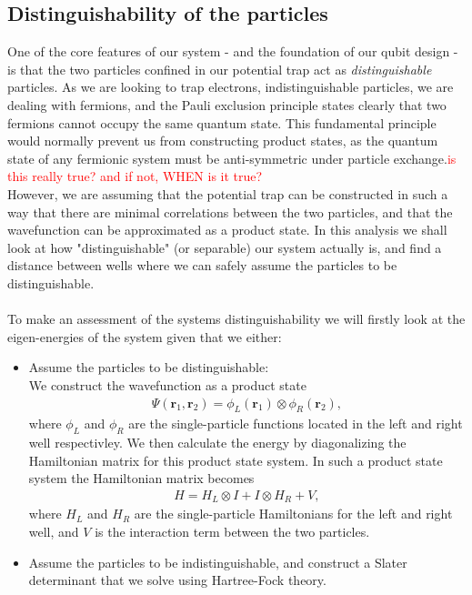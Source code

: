 \documentclass{subfiles}
\begin{document}
\subsection{Distinguishability of the particles}\label{sec:distinguishability}
One of the core features of our system - and the foundation of our qubit design - is that the two particles confined in our potential trap act as \emph{distinguishable} particles. As we are looking to trap electrons, indistinguishable particles, we are dealing with fermions, and the Pauli exclusion principle states clearly that two fermions cannot occupy the same quantum state. This fundamental principle would normally prevent us from constructing product states, as the quantum state of any fermionic system must be anti-symmetric under particle exchange.\textcolor{red}{is this really true? and if not, WHEN is it true?}
\\ However, we are assuming that the potential trap can be constructed in such a way that there are minimal correlations between the two particles, and that the wavefunction can be approximated as a product state. In this analysis we shall look at how "distinguishable" (or separable) our system actually is, and find a distance between wells where we can safely assume the particles to be distinguishable. \\ \\
To make an assessment of the systems distinguishability we will firstly look at the eigen-energies of the system given that we either:
\begin{itemize}
    \item Assume the particles to be distinguishable: \\ We construct the wavefunction as a product state
    \begin{align*}
        \Psi(\mathbf{r}_1, \mathbf{r}_2) = \phi_L(\mathbf{r}_1)\otimes\phi_R(\mathbf{r}_2),
    \end{align*} 
    where $\phi_L$ and $\phi_R$ are the single-particle functions located in the left and right well respectivley. We then calculate the energy by diagonalizing the Hamiltonian matrix for this product state system. In such a product state system the Hamiltonian matrix becomes
    \begin{align*}
        H = H_L \otimes I + I \otimes H_R + V,
    \end{align*}
    where $H_L$ and $H_R$ are the single-particle Hamiltonians for the left and right well, and $V$ is the interaction term between the two particles.
    \item Assume the particles to be indistinguishable, and construct a Slater determinant that we solve using Hartree-Fock theory.
\end{itemize}
\end{document}
